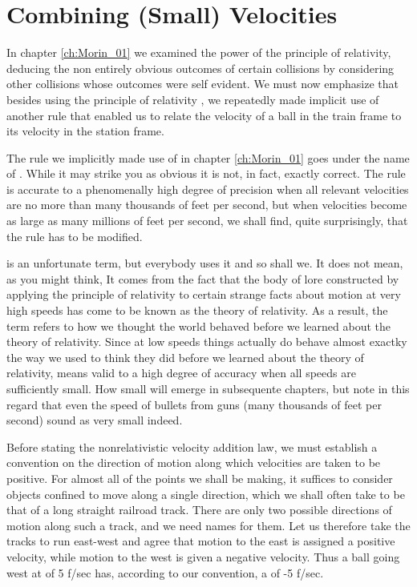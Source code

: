 \chapter{Combining (Small) Velocities}
\label{ch:Morin_02}
In chapter \ref{ch:Morin_01} we examined the power of the principle of relativity, deducing the non entirely obvious outcomes of certain collisions by considering other collisions whose outcomes were self evident. We must now emphasize that besides using the principle of relativity , we repeatedly made implicit use of another rule that enabled us to relate the velocity of a ball in the train frame to its velocity in the station frame. 

The rule we implicitly made use of in chapter \ref{ch:Morin_01} goes under the name of . While it may strike you as obvious it is not, in fact, exactly correct.  The rule is accurate to a phenomenally high degree of precision when all relevant velocities are no more than many thousands of feet per second, but when velocities become as large as many millions of feet per second, we shall find, quite surprisingly, that the rule has to be modified.

 is an unfortunate term, but everybody uses it and so shall we. It does not mean, as you might think,  It comes from the fact that the body of lore constructed by applying the principle of relativity to certain strange facts about motion at very high speeds has come to be known as the theory of relativity. As a result, the term  refers to how we thought the world behaved before we learned about the theory of relativity. Since at low speeds things actually do behave almost exactky the way we used to think they did before we learned about the theory of relativity,  means valid to a high degree of accuracy when all speeds are sufficiently small. How small will emerge in subsequente chapters, but note in this regard that even the speed of bullets from guns (many thousands of feet per second) sound as very small indeed. 

Before stating the nonrelativistic velocity addition law, we must establish a convention on the direction of motion along which velocities are taken to be positive. For almost all of the points we shall be making, it suffices to consider objects confined to move along a single direction, which we shall often take to be that of a long straight railroad track. There are only two possible directions of motion along such a track, and we need names for them. Let us therefore take the tracks to run east-west and agree that motion to the east is assigned a positive velocity, while motion to the west is given a negative velocity. Thus a ball going west at  of 5 f/sec has, according to our convention, a  of -5 f/sec.

